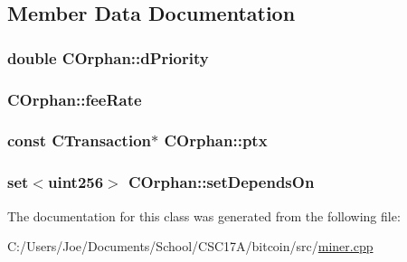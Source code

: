 \subsection{Member Data Documentation}
\hypertarget{class_c_orphan_a899f7928b6d4e9206ce04d5b2953da33}{}
\subsubsection[{d\+Priority}]{\setlength{\rightskip}{0pt plus 5cm}double C\+Orphan\+::d\+Priority}\label{class_c_orphan_a899f7928b6d4e9206ce04d5b2953da33}
\hypertarget{class_c_orphan_a2aab629162d580085082408643149e92}{}
\subsubsection[{fee\+Rate}]{ C\+Orphan\+::fee\+Rate}\label{class_c_orphan_a2aab629162d580085082408643149e92}
\hypertarget{class_c_orphan_a6bc886fad47f30a4c1cc80dc764e4095}{}
\subsubsection[{ptx}]{\setlength{\rightskip}{0pt plus 5cm}const C\+Transaction$\ast$ C\+Orphan\+::ptx}\label{class_c_orphan_a6bc886fad47f30a4c1cc80dc764e4095}
\hypertarget{class_c_orphan_a1b19183565d42c20ded09a2cc787fc50}{}
\subsubsection[{set\+Depends\+On}]{\setlength{\rightskip}{0pt plus 5cm}set$<${\bf uint256}$>$ C\+Orphan\+::set\+Depends\+On}\label{class_c_orphan_a1b19183565d42c20ded09a2cc787fc50}


The documentation for this class was generated from the following file\+:\begin{DoxyCompactItemize}
\item 
C\+:/\+Users/\+Joe/\+Documents/\+School/\+C\+S\+C17\+A/bitcoin/src/\hyperlink{miner_8cpp}{miner.\+cpp}\end{DoxyCompactItemize}
